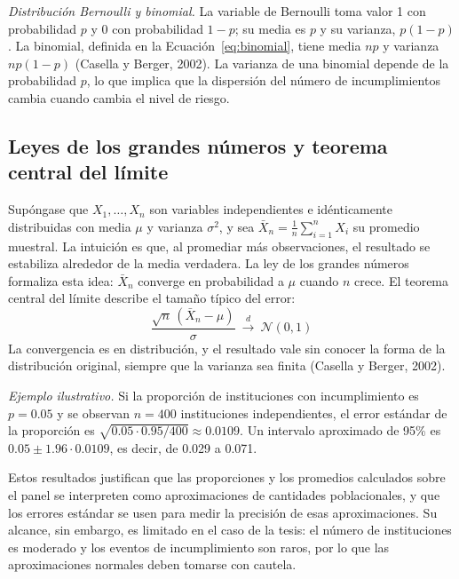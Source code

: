 \textit{Distribución Bernoulli y binomial.} La variable de Bernoulli toma valor 1 con probabilidad $p$ y 0 con probabilidad $1-p$; su media es $p$ y su varianza, $p(1-p)$. La binomial, definida en la Ecuación~\eqref{eq:binomial}, tiene media $np$ y varianza $np(1-p)$ (Casella y Berger, 2002). La varianza de una binomial depende de la probabilidad $p$, lo que implica que la dispersión del número de incumplimientos cambia cuando cambia el nivel de riesgo.

\subsection{Leyes de los grandes números y teorema central del límite}
Supóngase que $X_1,\dots,X_n$ son variables independientes e idénticamente distribuidas con media $\mu$ y varianza $\sigma^2$, y sea $\bar{X}_n=\frac{1}{n}\sum_{i=1}^n X_i$ su promedio muestral. La intuición es que, al promediar más observaciones, el resultado se estabiliza alrededor de la media verdadera. La ley de los grandes números formaliza esta idea: $\bar{X}_n$ converge en probabilidad a $\mu$ cuando $n$ crece. El teorema central del límite describe el tamaño típico del error:
\begin{equation}
\frac{\sqrt{n}\,(\bar{X}_n-\mu)}{\sigma}\ \xrightarrow{\ d\ }\ \mathcal{N}(0,1)
\label{eq:tcl}
\end{equation}
La convergencia es en distribución, y el resultado vale sin conocer la forma de la distribución original, siempre que la varianza sea finita (Casella y Berger, 2002).

\textit{Ejemplo ilustrativo.} Si la proporción de instituciones con incumplimiento es $p=0.05$ y se observan $n=400$ instituciones independientes, el error estándar de la proporción es $\sqrt{0.05\cdot 0.95/400}\approx 0.0109$. Un intervalo aproximado de 95\% es $0.05\pm 1.96\cdot 0.0109$, es decir, de 0.029 a 0.071.

Estos resultados justifican que las proporciones y los promedios calculados sobre el panel se interpreten como aproximaciones de cantidades poblacionales, y que los errores estándar se usen para medir la precisión de esas aproximaciones. Su alcance, sin embargo, es limitado en el caso de la tesis: el número de instituciones es moderado y los eventos de incumplimiento son raros, por lo que las aproximaciones normales deben tomarse con cautela.

